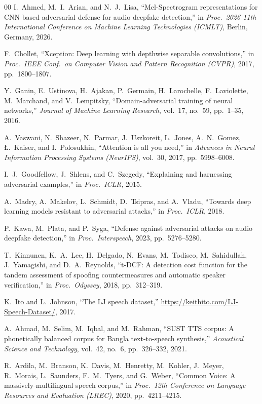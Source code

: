 \documentclass[conference]{IEEEtran}
\begin{document}
\begin{thebibliography}{00}
I.~Ahmed, M.~I.~Arian, and N.~J.~Lisa, ``Mel-Spectrogram representations
for CNN based adversarial defense for audio deepfake detection,''
in \emph{Proc.\ 2026 11th International Conference on Machine Learning
Technologies (ICMLT)}, Berlin, Germany, 2026.

F.~Chollet, ``Xception: Deep learning with depthwise separable
convolutions,'' in \emph{Proc.\ IEEE Conf.\ on Computer Vision and
Pattern Recognition (CVPR)}, 2017, pp.~1800--1807.

Y.~Ganin, E.~Ustinova, H.~Ajakan, P.~Germain, H.~Larochelle,
F.~Laviolette, M.~Marchand, and V.~Lempitsky, ``Domain-adversarial training
of neural networks,'' \emph{Journal of Machine Learning Research}, vol.~17,
no.~59, pp.~1--35, 2016.

A.~Vaswani, N.~Shazeer, N.~Parmar, J.~Uszkoreit, L.~Jones, A.~N.~Gomez,
{\L}.~Kaiser, and I.~Polosukhin, ``Attention is all you need,'' in
\emph{Advances in Neural Information Processing Systems (NeurIPS)},
vol.~30, 2017, pp.~5998--6008.

I.~J.~Goodfellow, J.~Shlens, and C.~Szegedy, ``Explaining and harnessing
adversarial examples,'' in \emph{Proc.\ ICLR}, 2015.

A.~Madry, A.~Makelov, L.~Schmidt, D.~Tsipras, and A.~Vladu, ``Towards
deep learning models resistant to adversarial attacks,'' in \emph{Proc.\
ICLR}, 2018.

P.~Kawa, M.~Plata, and P.~Syga, ``Defense against adversarial attacks on
audio deepfake detection,'' in \emph{Proc.\ Interspeech}, 2023,
pp.~5276--5280.

T.~Kinnunen, K.~A.~Lee, H.~Delgado, N.~Evans, M.~Todisco, M.~Sahidullah,
J.~Yamagishi, and D.~A.~Reynolds, ``t-DCF: A detection cost function for
the tandem assessment of spoofing countermeasures and automatic speaker
verification,'' in \emph{Proc.\ Odyssey}, 2018, pp.~312--319.

K.~Ito and L.~Johnson, ``The LJ speech dataset,''
\url{https://keithito.com/LJ-Speech-Dataset/}, 2017.

A.~Ahmad, M.~Selim, M.~Iqbal, and M.~Rahman, ``SUST TTS corpus: A
phonetically balanced corpus for Bangla text-to-speech synthesis,''
\emph{Acoustical Science and Technology}, vol.~42, no.~6, pp.~326--332,
2021.

R.~Ardila, M.~Branson, K.~Davis, M.~Henretty, M.~Kohler, J.~Meyer,
R.~Morais, L.~Saunders, F.~M.~Tyers, and G.~Weber, ``Common Voice: A
massively-multilingual speech corpus,'' in \emph{Proc.\ 12th Conference on
Language Resources and Evaluation (LREC)}, 2020, pp.~4211--4215.

\end{thebibliography}
\fi
\end{document}
